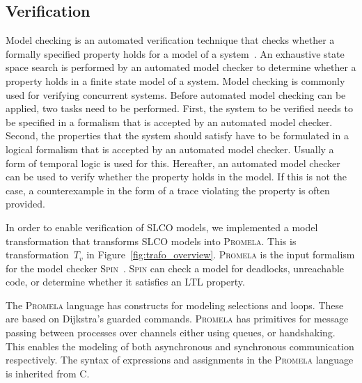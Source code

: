 \subsection{Verification}
\label{subsec:verification}
Model checking is an automated verification technique that checks whether a formally specified property holds for a model of a system~\cite{Clarke1999}.
An exhaustive state space search is performed by an automated model checker to determine whether a property holds in a finite state model of a system.
Model checking is commonly used for verifying concurrent systems.
Before automated model checking can be applied, two tasks need to be performed.
First, the system to be verified needs to be specified in a formalism that is accepted by an automated model checker.
Second, the properties that the system should satisfy have to be formulated in a logical formalism that is accepted by an automated model checker.
Usually a form of temporal logic is used for this.
Hereafter, an automated model checker can be used to verify whether the property holds in the model.
If this is not the case, a counterexample in the form of a trace violating the property is often provided.

In order to enable verification of SLCO models, we implemented a model transformation that transforms SLCO models into \textsc{Promela}.
This is transformation~$T_v$ in Figure~\ref{fig:trafo_overview}.
\textsc{Promela} is the input formalism for the model checker \textsc{Spin}~\cite{Holzmann2003}.
\textsc{Spin} can check a model for deadlocks, unreachable code, or determine whether it satisfies an LTL property.

The \textsc{Promela} language has constructs for modeling selections and loops.
These are based on Dijkstra's guarded commands.
\textsc{Promela} has primitives for message passing between processes over channels either using queues, or handshaking.
This enables the modeling of both asynchronous and synchronous communication respectively.
The syntax of expressions and assignments in the \textsc{Promela} language is inherited from \textsf{C}.

